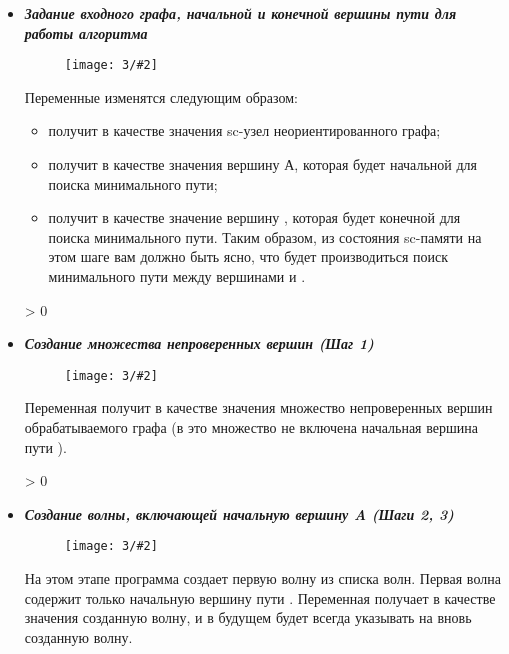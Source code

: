 
\newenvironment{algostep}[3]
{
  \ifnum \value{algosteps} > 0
  \newpage
  \fi
  \addtocounter{algosteps}{1}

  \label{astep:#2}
  \item \emph{\textbf{#1}}
  
  \begin{figure}[h!]
    \centering
    \texttt{[image: 3/\#2]}
  \end{figure}
}
{
}

\begin{itemize}
\begin{algostep}{Задание входного графа, начальной и конечной вершины
    пути для работы алгоритма}{S1_Input_graph}{0.8}
  
  Переменные изменятся следующим образом:

  \begin{itemize}
  \item {} получит в качестве значения sc-узел
    неориентированного графа;
  \item {} получит в качестве
    значения вершину А, которая будет начальной для поиска минимального
    пути;
  \item {} получит в качестве значение вершину ,
    которая будет конечной для поиска минимального пути.  Таким образом,
    из состояния sc-памяти на этом шаге вам должно быть ясно, что будет
    производиться поиск минимального пути между вершинами  и .
  \end{itemize}
\end{algostep}


\begin{algostep}{Создание множества непроверенных вершин (Шаг
    1)}{S2_Create_unchecked_vertexes_set}{0.8}

  Переменная  получит в качестве значения
  множество непроверенных вершин обрабатываемого графа (в это множество
  не включена начальная вершина пути ).
\end{algostep}


\begin{algostep}{Создание волны, включающей начальную вершину A (Шаги
    2, 3)}{S3_Create_1st_wave}{0.8}

  На этом этапе программа создает первую волну из списка волн. Первая
  волна содержит только начальную вершину пути . Переменная
   получает в качестве значения созданную волну, и в
  будущем будет всегда указывать на вновь созданную волну.


\end{algostep}
\end{itemize}
